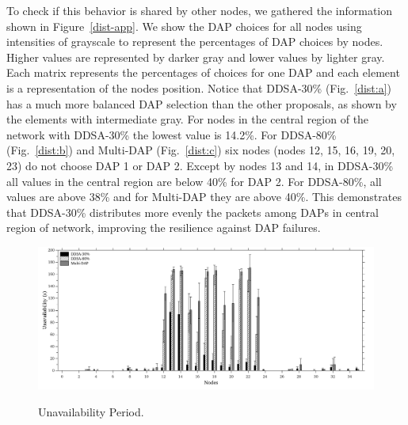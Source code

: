 \documentclass[conference]{IEEEtran}
\begin{document}
To check if this behavior is shared by other nodes, we gathered the information shown in Figure~\ref{dist-app}. We show the DAP choices for all nodes using intensities of grayscale to represent the percentages of DAP choices by nodes. Higher values are represented by darker gray and lower values by lighter gray. Each matrix represents the percentages of choices for one DAP and each element is a representation of the  nodes position.  Notice that DDSA-30\% (Fig.~\ref{dist:a}) has a much more balanced DAP selection than the other proposals, as shown by the elements with intermediate gray. For nodes in the central region of the network with DDSA-30\% the lowest value is 14.2\%. For DDSA-80\% (Fig.~\ref{dist:b}) and Multi-DAP (Fig.~\ref{dist:c}) six nodes (nodes 12, 15, 16, 19, 20, 23) ​​do not choose  DAP 1 or DAP 2. Except by nodes 13 and 14, in DDSA-30\% all values in the central region are below 40\% for DAP 2. For DDSA-80\%, all values are above 38\% and for Multi-DAP they are above 40\%. This demonstrates that DDSA-30\% distributes more evenly the packets among DAPs  in central region of network, improving the resilience against DAP failures.



\begin{figure}[htb]
  \centering
  \label{intv-dap}{\includegraphics[scale=.175]{IEEE-consolidados/G-wo-rcv-pkt.jpg}} 
  \caption{Unavailability Period.}
  \label{sum-intv}
\end{figure}
\end{document}

